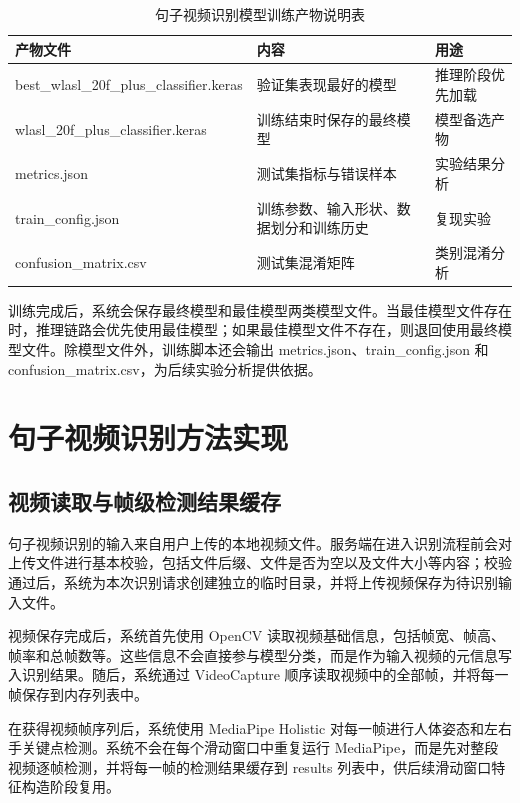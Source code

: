 \begin{longtable}{L{0.32\textwidth} L{0.30\textwidth} L{0.30\textwidth}}
  \caption{句子视频识别模型训练产物说明表}
  \label{tab:chapter06-sentence-model-artifacts}\\
  \toprule
  产物文件 & 内容 & 用途 \\
  \midrule
  best\_wlasl\_20f\_plus\_classifier.keras & 验证集表现最好的模型 & 推理阶段优先加载 \\
  wlasl\_20f\_plus\_classifier.keras & 训练结束时保存的最终模型 & 模型备选产物 \\
  metrics.json & 测试集指标与错误样本 & 实验结果分析 \\
  train\_config.json & 训练参数、输入形状、数据划分和训练历史 & 复现实验 \\
  confusion\_matrix.csv & 测试集混淆矩阵 & 类别混淆分析 \\
  \bottomrule
\end{longtable}

训练完成后，系统会保存最终模型和最佳模型两类模型文件。当最佳模型文件存在时，推理链路会优先使用最佳模型；如果最佳模型文件不存在，则退回使用最终模型文件。除模型文件外，训练脚本还会输出 metrics.json、train\_config.json 和 confusion\_matrix.csv，为后续实验分析提供依据。

\section{句子视频识别方法实现}

\subsection{视频读取与帧级检测结果缓存}




句子视频识别的输入来自用户上传的本地视频文件。服务端在进入识别流程前会对上传文件进行基本校验，包括文件后缀、文件是否为空以及文件大小等内容；校验通过后，系统为本次识别请求创建独立的临时目录，并将上传视频保存为待识别输入文件。

视频保存完成后，系统首先使用 OpenCV 读取视频基础信息，包括帧宽、帧高、帧率和总帧数等。这些信息不会直接参与模型分类，而是作为输入视频的元信息写入识别结果。随后，系统通过 VideoCapture 顺序读取视频中的全部帧，并将每一帧保存到内存列表中。

在获得视频帧序列后，系统使用 MediaPipe Holistic 对每一帧进行人体姿态和左右手关键点检测。系统不会在每个滑动窗口中重复运行 MediaPipe，而是先对整段视频逐帧检测，并将每一帧的检测结果缓存到 results 列表中，供后续滑动窗口特征构造阶段复用。

